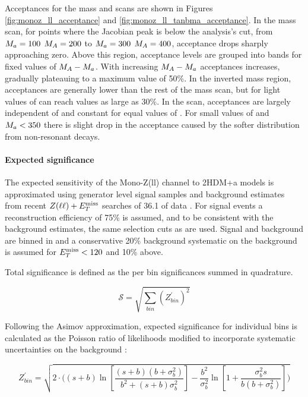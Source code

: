 Acceptances for the mass and \tanb scans are shown in Figures \ref{fig:monoz_ll_acceptance} and \ref{fig:monoz_ll_tanbma_acceptance}.  
In the mass scan, for points where the Jacobian peak is below the analysis's \MET cut, from $M_{a} = 100$ $M_{A} = 200$ to $M_{a} = 300$ $M_{A} = 400$, 
acceptance drops sharply approaching zero.  Above this region, acceptance levels are grouped into bands for fixed values of $M_{A}-M_{a}$. 
With increasing $M_{A}-M_{a}$ acceptances increases, gradually plateauing to a maximum value of 50\%.  In the inverted mass region, 
acceptances are generally lower than the rest of the mass scan, but for light values of \ma can reach values as large as 30\%.
In the \tanb scan, acceptances are largely independent of \tanb and constant for equal values of \ma.  For small values of \tanb and
$M_{a} < 350$ \GeV  there is slight drop in the acceptance caused by the softer \MET distribution from non-resonant decays.  


\paragraph{Expected significance}

The expected sensitivity of the Mono-Z(ll) channel to 2HDM+a models is approximated using generator level signal samples and background estimates from recent $Z(\ell \ell) + E_T^\mathrm{miss}$ searches of 36.1 \ifb of data \cite{Aaboud:2017bja}.  For signal events a reconstruction efficiency of 75\% is assumed, and to be consistent with the background estimates, the same selection cuts as \cite{Aaboud:2017bja} are used.  Signal and background are binned in \MET and a conservative 20\% background systematic on the background is assumed for $E_T^\mathrm{miss} < 120$ \GeV and 10\% above.

Total significance is defined as the per bin significances summed in quadrature.

\begin{equation}
\mathcal{S} = \sqrt{\sum_{bin} (Z^\prime_{bin})^2}
\end{equation}

Following the Asimov approximation, expected significance for individual bins is calculated as the Poisson ratio of likelihoods modified to incorporate  systematic uncertainties on the background  \cite{Cowan:2012}:  

\begin{equation}
\label{eq:significance_wsyst}
Z^\prime_{bin} = \sqrt{ 2 \cdot \bigg( (s+b) \ln[\frac{ (s+b) (b+\sigma_b^2) } {b^2 + (s+b) \sigma_b^2} ]- \frac{b^2}{\sigma_b^2} \ln[1 + \frac{\sigma_b^2 s}{b(b+\sigma_b^2)} ] \bigg) }
\end{equation}


